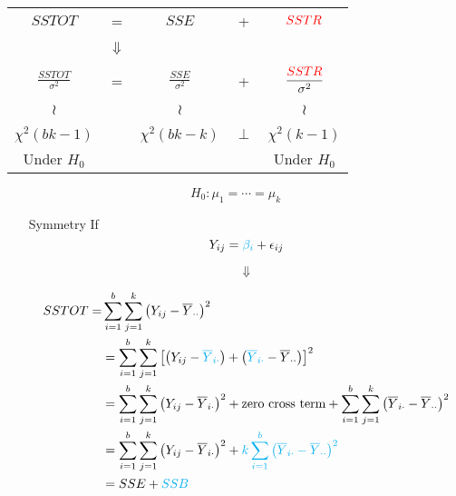 \begin{frame}[fragile]
	\begin{center}
		\begin{tabular}{ccccc}
			$\displaystyle SSTOT$ &
			= &
			$\displaystyle SSE$ &
			+ &
			$\displaystyle \textcolor{red}{SSTR}$ \\ \\
			  &$\Downarrow$&&& \\ \\
			$\displaystyle \frac{SSTOT}{\sigma^2}$ &
			= &
			$\displaystyle \frac{SSE}{\sigma^2}$ &
			+ &
			$\displaystyle \frac{\textcolor{red}{SSTR}}{\sigma^2}$ \\ \\
			$\wr$&& $\wr$ &  & $\wr$ \\ \\
			$\chi^2(bk-1)$ && $\chi^2(bk-k)$ & $\perp$ & $\chi^2(k-1)$
			\\[2em]
			Under $H_0$& & \checkmark && Under $H_0$
		\end{tabular}
\vfill
\[
H_0: \mu_1=\cdots =\mu_k
\]
	\end{center}
\end{frame}
\begin{frame}[fragile]
	\begin{enumerate}
		\item[Symmetry] If
			\[
				Y_{ij} = \textcolor{cyan}{\beta_i} + \epsilon_{ij}
			\]
		\item[]
			\[\Downarrow\]
		\item[]
	\begin{align*}
		SSTOT = & \sum_{i=1}^b\sum_{j=1}^k \left(Y_{ij}-\overline{Y}_{\cdot\cdot} \right)^2
		     \\ & =  \sum_{i=1}^b\sum_{j=1}^k\left[ \left(Y_{ij}-\textcolor{cyan}{\overline{Y}_{i\cdot}} \right)+\left(\textcolor{cyan}{\overline{Y}_{i\cdot}} - \overline{Y}_{\cdot\cdot}\right)\right]^2
		     \\ & =  \sum_{i=1}^b\sum_{j=1}^k\left(Y_{ij}-\overline{Y}_{i\cdot} \right)^2+ \text{zero cross term}+\sum_{i=1}^b\sum_{j=1}^k\left(\overline{Y}_{i\cdot} - \overline{Y}_{\cdot\cdot}\right)^2
		     \\ & =  \sum_{i=1}^b\sum_{j=1}^k\left(Y_{ij}-\overline{Y}_{i\cdot} \right)^2+ \textcolor{cyan}{k\sum_{i=1}^b\left(\overline{Y}_{i\cdot} - \overline{Y}_{\cdot\cdot}\right)^2
}		      \\&= SSE +\textcolor{cyan}{SSB}
	\end{align*}
	\end{enumerate}
\end{frame}
